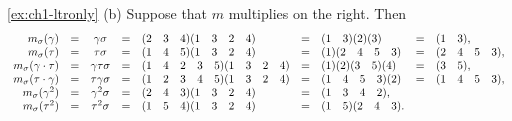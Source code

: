 \begin{solution}{\ref{ex:ch1-ltronly}}
{    (b) Suppose that \(m\) multiplies on the right. Then
    \[
    \begin{array}{rccclclcl}
        m_{\sigma}(\gamma)          & = & \gamma\sigma     & = & (2 \quad 3 \quad 4)(1 \quad 3 \quad 2 \quad 4)           & = & (1 \quad 3)(2)(3)        & = & (1 \quad 3),\\
        m_{\sigma}(\tau)            & = & \tau\sigma       & = & (1 \quad 4 \quad 5)(1 \quad 3 \quad 2 \quad 4)           & = & (1)(2 \quad 4 \quad 5 \quad 3) & = & (2 \quad 4 \quad 5 \quad 3),\\
        m_{\sigma}(\gamma\cdot\tau) & = & \gamma\tau\sigma & = & (1 \quad 4 \quad 2 \quad 3 \quad 5)(1 \quad 3 \quad 2 \quad 4) & = & (1)(2)(3 \quad 5)(4)     & = & (3 \quad 5),\\
        m_{\sigma}(\tau\cdot\gamma) & = & \tau\gamma\sigma & = & (1 \quad 2 \quad 3 \quad 4 \quad 5)(1 \quad 3 \quad 2 \quad 4) & = & (1 \quad 4 \quad 5 \quad 3)(2) & = & (1 \quad 4 \quad 5 \quad 3),\\
        m_{\sigma}(\gamma^{2})      & = & \gamma^{2}\sigma & = & (2 \quad 4 \quad 3)(1 \quad 3 \quad 2 \quad 4)           & = & (1 \quad 3 \quad 4 \quad 2),&&\\
        m_{\sigma}(\tau^{2})        & = & \tau^{2}\sigma   & = & (1 \quad 5 \quad 4)(1 \quad 3 \quad 2 \quad 4)           & = & (1 \quad 5)(2 \quad 4 \quad 3).&&
    \end{array}
    \]
}\end{solution}

